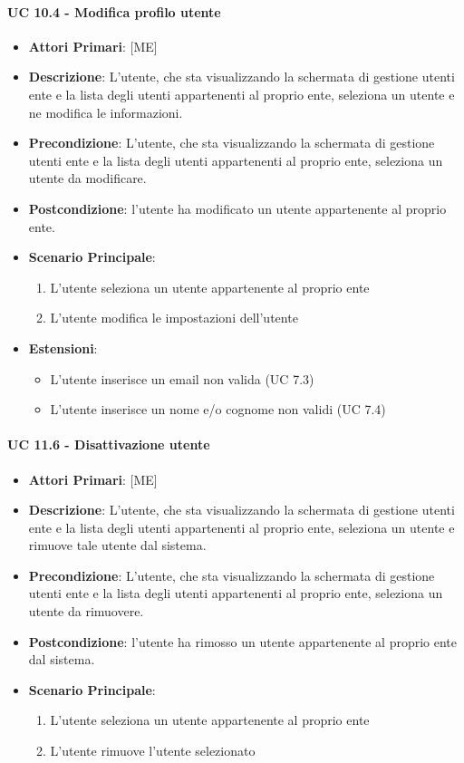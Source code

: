 			\paragraph{UC 10.4 - Modifica profilo utente}
			\begin{itemize}
				\item \textbf{Attori Primari}: [ME]
				\item \textbf{Descrizione}: L'utente,  che sta visualizzando la schermata di gestione utenti ente e la lista degli utenti appartenenti al proprio ente, seleziona un utente e ne modifica le informazioni.
				\item \textbf{Precondizione}: L'utente, che sta visualizzando la schermata di gestione utenti ente e la lista degli utenti appartenenti al proprio ente, seleziona un utente da modificare.
				\item \textbf{Postcondizione}: l'utente ha modificato un utente appartenente al proprio ente.
				\item \textbf{Scenario Principale}:
				\begin{enumerate}
					\item{L'utente seleziona un utente appartenente al proprio ente}
					\item{L'utente modifica le impostazioni dell'utente}
				\end{enumerate}	
				\item \textbf{Estensioni}:
				\begin{itemize}
					\item L'utente inserisce un email non valida (UC 7.3)
					\item L'utente inserisce un nome e/o cognome non validi (UC 7.4)
				\end{itemize}
			\end{itemize}
			
			\paragraph{UC 11.6 - Disattivazione utente}
			\begin{itemize}
				\item \textbf{Attori Primari}: [ME]
				\item \textbf{Descrizione}: L'utente,  che sta visualizzando la schermata di gestione utenti ente e la lista degli utenti appartenenti al proprio ente, seleziona un utente e rimuove tale utente dal sistema.
				\item \textbf{Precondizione}: L'utente, che sta visualizzando la schermata di gestione utenti ente e la lista degli utenti appartenenti al proprio ente, seleziona un utente da rimuovere.
				\item \textbf{Postcondizione}: l'utente ha rimosso un utente appartenente al proprio ente dal sistema.
				\item \textbf{Scenario Principale}:
				\begin{enumerate}
					\item{L'utente seleziona un utente appartenente al proprio ente}
					\item{L'utente rimuove l'utente selezionato}
				\end{enumerate}		
			\end{itemize}
